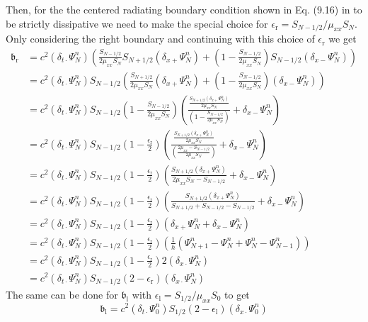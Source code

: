 \documentclass[dvipsnames]{article}
\def\dxp{\delta_{x+}}
\def\dxm{\delta_{x-}}
\def\dtd{\delta_{t\cdot}}
\begin{document}
Then, for the the centered radiating boundary condition shown in Eq. (9.16) in \cite{Bilbao2009}  %
to be strictly dissipative we need to make the special choice for $\epsilon_\text{r} = S_{N-1/2} / \mu_{xx}S_N$. Only considering the right boundary and continuing with this choice of $\epsilon_\text{r}$ we get
\begin{equation}
    \begin{aligned}
        \mathfrak{b}_\text{r} &= c^2 (\dtd\Psi_N^n)\left(\frac{S_{N-1/2}}{2\mu_{xx}S_N}S_{N+1/2}(\dxp\Psi_N^n)+\left(1-\frac{S_{N-1/2}}{2\mu_{xx}S_N}\right)S_{N-1/2}(\dxm\Psi_N^n)\right)\\
        &= c^2 (\dtd\Psi_N^n)S_{N-1/2}\left(\frac{S_{N+1/2}}{2\mu_{xx}S_N}(\dxp\Psi_N^n)+\left(1-\frac{S_{N-1/2}}{2\mu_{xx}S_N}\right)(\dxm\Psi_N^n)\right)\\
        &=c^2 (\dtd\Psi_N^n)S_{N-1/2}\left(1-\frac{S_{N-1/2}}{2\mu_{xx}S_N}\right)\left(\frac{\frac{S_{N+1/2}(\dxp\Psi_N^n)}{2\mu_{xx}S_N}}{\left(1-\frac{S_{N-1/2}}{2\mu_{xx}S_N}\right)}+\dxm\Psi_N^n\right)\\
        &=c^2 (\dtd\Psi_N^n)S_{N-1/2}\left(1-\frac{\epsilon_\text{r}}{2}\right)\left(\frac{\frac{S_{N+1/2}(\dxp\Psi_N^n)}{2\mu_{xx}S_N}}{\left(\frac{2\mu_{xx} - S_{N-1/2}}{2\mu_{xx}S_N}\right)}+\dxm\Psi_N^n\right)\\
        &=c^2 (\dtd\Psi_N^n)S_{N-1/2}\left(1-\frac{\epsilon_\text{r}}{2}\right)\left(\frac{S_{N+1/2}(\dxp\Psi_N^n)}{2\mu_{xx}S_N - S_{N-1/2}}+\dxm\Psi_N^n\right)\\
        &=c^2 (\dtd\Psi_N^n)S_{N-1/2}\left(1-\frac{\epsilon_\text{r}}{2}\right)\left(\frac{S_{N+1/2}(\dxp\Psi_N^n)}{S_{N+1/2} + S_{N-1/2} - S_{N-1/2}}+\dxm\Psi_N^n\right)\\
        &=c^2 (\dtd\Psi_N^n)S_{N-1/2}\left(1-\frac{\epsilon_\text{r}}{2}\right)\left(\dxp\Psi_N^n+\dxm\Psi_N^n\right)\\
        &=c^2 (\dtd\Psi_N^n)S_{N-1/2}\left(1-\frac{\epsilon_\text{r}}{2}\right)\left(\frac{1}{h}\left(\Psi_{N+1}^n - \Psi_N^n + \Psi_N^n - \Psi_{N-1}^n\right)\right)\\
&= c^2 (\dtd\Psi_N^n)S_{N-1/2}\left(1-\frac{\epsilon_\text{r}}{2}\right)2(\delta_{x\cdot}\Psi_N^n)\\
&= c^2 (\dtd\Psi_N^n)S_{N-1/2}\left(2-\epsilon_\text{r}\right)(\delta_{x\cdot}\Psi_N^n)
    \end{aligned}
\end{equation}
The same can be done for $\mathfrak{b}_\text{l}$ with $\epsilon_\text{l} = S_{1/2}/\mu_{xx}S_0$ to get
\begin{equation}
    \mathfrak{b}_\text{l} = c^2(\dtd\Psi_0^n)S_{1/2}\left(2-\epsilon_\text{l}\right)(\delta_{x\cdot}\Psi_0^n)
\end{equation}
\end{document}
